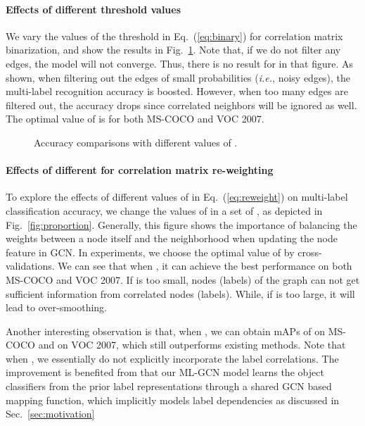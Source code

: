 \documentclass[10pt,twocolumn,letterpaper]{article}
\begin{document}
\paragraph{Effects of different threshold values }

We vary the values of the threshold  in Eq.~(\ref{eq:binary}) for correlation matrix binarization, and show the results in Fig.~\ref{fig:threshold}. Note that, if we do not filter any edges, the model will not converge. Thus, there is no result for  in that figure. As shown, when filtering out the edges of small probabilities (\emph{i.e.}, noisy edges), the multi-label recognition accuracy is boosted. However, when too many edges are filtered out, the accuracy drops since correlated neighbors will be ignored as well. The optimal value of  is  for both MS-COCO and VOC 2007.

\begin{figure}[t]
	\centering
	\caption{Accuracy comparisons with different values of .}
	\label{fig:threshold}
\end{figure}

\paragraph{Effects of different  for correlation matrix re-weighting}

To explore the effects of different values of  in Eq.~(\ref{eq:reweight}) on multi-label classification accuracy, we change the values of  in a set of , as depicted in Fig.~\ref{fig:proportion}. Generally, this figure shows the importance of balancing the weights between a node itself and the neighborhood when updating the node feature in GCN. In experiments, we choose the optimal value of  by cross-validations. We can see that when , it can achieve the best performance on both MS-COCO and VOC 2007. If  is too small, nodes (labels) of the graph can not get sufficient information from correlated nodes (labels). While, if  is too large, it will lead to over-smoothing. 

Another interesting observation is that, when , we can obtain mAPs of  on MS-COCO and  on VOC 2007, which still outperforms existing methods. Note that when , we essentially do not explicitly incorporate the label correlations. The improvement is benefited from that our ML-GCN model learns the object classifiers from the prior label representations through a shared GCN based mapping function, which implicitly models label dependencies as discussed in Sec.~\ref{sec:motivation}
\end{document}
